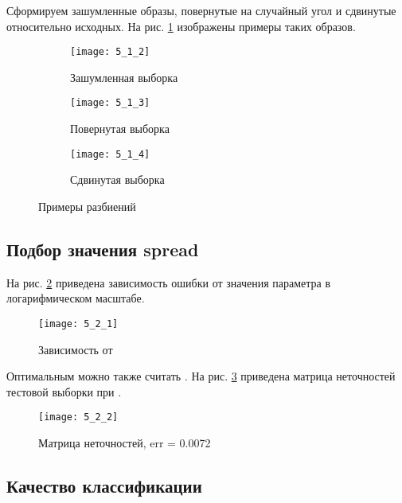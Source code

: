 Сформируем зашумленные образы, повернутые на случайный угол и сдвинутые относительно исходных. На рис. \ref{fig:5_1_2} изображены примеры таких образов.
\begin{figure}[H]
\begin{center}
	\begin{subfigure}[b]{\textwidth}
		\texttt{[image: 5\_1\_2]}
		\caption{Зашумленная выборка }
	\end{subfigure}
	\begin{subfigure}[b]{\textwidth}
		\texttt{[image: 5\_1\_3]}
		\caption{Повернутая выборка }
	\end{subfigure}
	\begin{subfigure}[b]{\textwidth}
		\texttt{[image: 5\_1\_4]}
		\caption{Сдвинутая выборка }
	\end{subfigure}
	\caption{Примеры разбиений}
	\label{fig:5_1_2}
\end{center}
\end{figure}

\subsection{Подбор значения spread}


На рис. \ref{fig:5_2_1} приведена зависимость ошибки  от значения параметра  в логарифмическом масштабе. 
\vspace{-0.5cm}
\begin{figure}[H]
\begin{center}
	\texttt{[image: 5\_2\_1]}
	\caption{Зависимость  от }
	\label{fig:5_2_1}
\end{center}
\end{figure}
\vspace{-1cm}

Оптимальным можно также считать . На рис. \ref{fig:5_2_2} приведена матрица неточностей тестовой выборки при .
\vspace{-0.5cm}
\begin{figure}[H]
\begin{center}
	\texttt{[image: 5\_2\_2]}
	\caption{Матрица неточностей, err = 0.0072}
	\label{fig:5_2_2}
\end{center}
\end{figure}

\subsection{Качество классификации}

